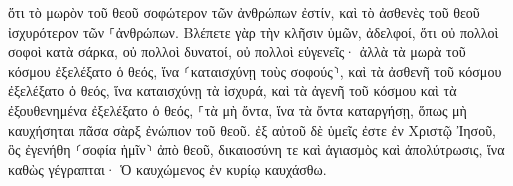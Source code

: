 \documentclass{openreader}
\begin{document}
ὅτι τὸ μωρὸν τοῦ θεοῦ σοφώτερον τῶν ἀνθρώπων ἐστίν, καὶ τὸ ἀσθενὲς τοῦ θεοῦ ἰσχυρότερον τῶν ⸀ἀνθρώπων. 
Βλέπετε γὰρ τὴν κλῆσιν ὑμῶν, ἀδελφοί, ὅτι οὐ πολλοὶ σοφοὶ κατὰ σάρκα, οὐ πολλοὶ δυνατοί, οὐ πολλοὶ εὐγενεῖς· 
ἀλλὰ τὰ μωρὰ τοῦ κόσμου ἐξελέξατο ὁ θεός, ἵνα ⸂καταισχύνῃ τοὺς σοφούς⸃, καὶ τὰ ἀσθενῆ τοῦ κόσμου ἐξελέξατο ὁ θεός, ἵνα καταισχύνῃ τὰ ἰσχυρά, 
καὶ τὰ ἀγενῆ τοῦ κόσμου καὶ τὰ ἐξουθενημένα ἐξελέξατο ὁ θεός, ⸀τὰ μὴ ὄντα, ἵνα τὰ ὄντα καταργήσῃ, 
ὅπως μὴ καυχήσηται πᾶσα σὰρξ ἐνώπιον τοῦ θεοῦ. 
ἐξ αὐτοῦ δὲ ὑμεῖς ἐστε ἐν Χριστῷ Ἰησοῦ, ὃς ἐγενήθη ⸂σοφία ἡμῖν⸃ ἀπὸ θεοῦ, δικαιοσύνη τε καὶ ἁγιασμὸς καὶ ἀπολύτρωσις, 
ἵνα καθὼς γέγραπται· Ὁ καυχώμενος ἐν κυρίῳ καυχάσθω. 
\end{document}

